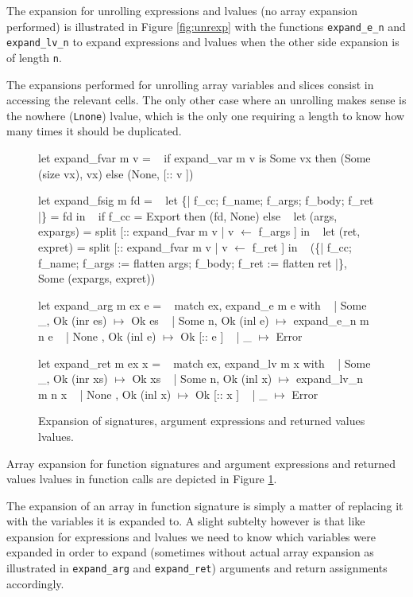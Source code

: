 \documentclass{article}
\begin{document}
The expansion for unrolling expressions and lvalues (no array expansion
performed) is illustrated in Figure \ref{fig:unrexp} with the functions
\texttt{expand\_e\_n} and \texttt{expand\_lv\_n} to expand expressions and
lvalues when the other side expansion is of length \texttt{n}.

The expansions performed for unrolling array variables and slices consist in
accessing the relevant cells. The only other case where an unrolling makes sense
is the nowhere (\texttt{Lnone}) lvalue, which is the only one requiring a length
to know how many times it should be duplicated.

\medskip

\begin{figure}[t]
\obeylines\obeyspaces\ttfamily%
let expand\_fvar m v =
~ if expand\_var m v is Some vx then (Some (size vx), vx) else (None, [:: v ])

let expand\_fsig m fd =
~ let \{| f\_cc; f\_name; f\_args; f\_body; f\_ret |\} = fd in
~ if f\_cc = Export then (fd, None) else
~ let (args, expargs) = split [:: expand\_fvar m v | v \(\gets\) f\_args ] in
~ let (ret,  expret)  = split [:: expand\_fvar m v | v \(\gets\) f\_ret  ] in
~ (\{| f\_cc; f\_name; f\_args := flatten args; f\_body; f\_ret := flatten ret |\},
~   Some (expargs, expret))

let expand\_arg m ex e =
~ match ex, expand\_e m e with
~ | Some \_, Ok (inr es)  \(\mapsto\) Ok es
~ | Some n, Ok (inl e)   \(\mapsto\) expand\_e\_n m n e
~ | None  , Ok (inl e)   \(\mapsto\) Ok [:: e ]
~ | \_                    \(\mapsto\) Error

let expand\_ret m ex x =
~ match ex, expand\_lv m x with
~ | Some \_, Ok (inr xs)   \(\mapsto\) Ok xs
~ | Some n, Ok (inl x)    \(\mapsto\) expand\_lv\_n m n x
~ | None  , Ok (inl x)    \(\mapsto\) Ok [:: x ]
~ | \_                     \(\mapsto\) Error
\normalfont%
\caption{Expansion of signatures, argument expressions and returned values lvalues.}\label{fig:sigexp}
\end{figure}

Array expansion for function signatures and argument expressions and
returned values lvalues in function calls are depicted in Figure
\ref{fig:sigexp}.

The expansion of an array in function signature is simply a matter of replacing
it with the variables it is expanded to. A slight subtelty however is that like
expansion for expressions and lvalues we need to know which variables were
expanded in order to expand (sometimes without actual array expansion as
illustrated in \texttt{expand\_arg} and \texttt{expand\_ret}) arguments and
return assignments accordingly.
\end{document}
